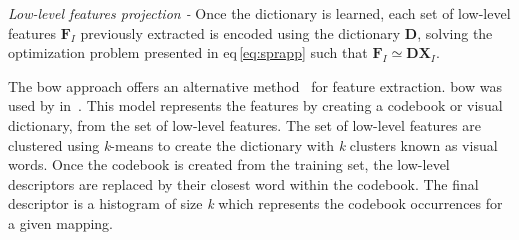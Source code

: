 \emph{Low-level features projection -} Once the dictionary is learned, each set of low-level features $\mathbf{F}_{I}$ previously extracted is encoded using the dictionary $\mathbf{D}$, solving the optimization problem presented in \acs{eq}\,\eqref{eq:sprapp} such that $\mathbf{F}_{I} \simeq \mathbf{DX}_{I}$.

The \ac{bow} approach offers an alternative method~\cite{Sivic2003} for feature extraction.
\Ac{bow} was used by \citeauthor{rampun2016computerb} in~\cite{rampun2015classifying,rampun2016computerb}.
This model represents the features by creating a codebook or visual dictionary, from the set of low-level features.
The set of low-level features are clustered using \textit{k}-means to create the dictionary with \textit{k} clusters known as visual words.
Once the codebook is created from the training set, the low-level descriptors are replaced by their closest word within the codebook.
The final descriptor is a histogram of size \textit{k} which represents the codebook occurrences for a given mapping.


